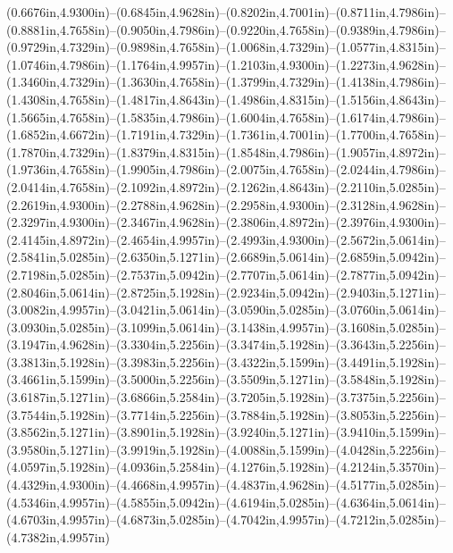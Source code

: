 (0.6676in,4.9300in)--(0.6845in,4.9628in)--(0.8202in,4.7001in)--(0.8711in,4.7986in)--(0.8881in,4.7658in)--(0.9050in,4.7986in)--(0.9220in,4.7658in)--(0.9389in,4.7986in)--(0.9729in,4.7329in)--(0.9898in,4.7658in)--(1.0068in,4.7329in)--(1.0577in,4.8315in)--(1.0746in,4.7986in)--(1.1764in,4.9957in)--(1.2103in,4.9300in)--(1.2273in,4.9628in)--(1.3460in,4.7329in)--(1.3630in,4.7658in)--(1.3799in,4.7329in)--(1.4138in,4.7986in)--(1.4308in,4.7658in)--(1.4817in,4.8643in)--(1.4986in,4.8315in)--(1.5156in,4.8643in)--(1.5665in,4.7658in)--(1.5835in,4.7986in)--(1.6004in,4.7658in)--(1.6174in,4.7986in)--(1.6852in,4.6672in)--(1.7191in,4.7329in)--(1.7361in,4.7001in)--(1.7700in,4.7658in)--(1.7870in,4.7329in)--(1.8379in,4.8315in)--(1.8548in,4.7986in)--(1.9057in,4.8972in)--(1.9736in,4.7658in)--(1.9905in,4.7986in)--(2.0075in,4.7658in)--(2.0244in,4.7986in)--(2.0414in,4.7658in)--(2.1092in,4.8972in)--(2.1262in,4.8643in)--(2.2110in,5.0285in)--(2.2619in,4.9300in)--(2.2788in,4.9628in)--(2.2958in,4.9300in)--(2.3128in,4.9628in)--(2.3297in,4.9300in)--(2.3467in,4.9628in)--(2.3806in,4.8972in)--(2.3976in,4.9300in)--(2.4145in,4.8972in)--(2.4654in,4.9957in)--(2.4993in,4.9300in)--(2.5672in,5.0614in)--(2.5841in,5.0285in)--(2.6350in,5.1271in)--(2.6689in,5.0614in)--(2.6859in,5.0942in)--(2.7198in,5.0285in)--(2.7537in,5.0942in)--(2.7707in,5.0614in)--(2.7877in,5.0942in)--(2.8046in,5.0614in)--(2.8725in,5.1928in)--(2.9234in,5.0942in)--(2.9403in,5.1271in)--(3.0082in,4.9957in)--(3.0421in,5.0614in)--(3.0590in,5.0285in)--(3.0760in,5.0614in)--(3.0930in,5.0285in)--(3.1099in,5.0614in)--(3.1438in,4.9957in)--(3.1608in,5.0285in)--(3.1947in,4.9628in)--(3.3304in,5.2256in)--(3.3474in,5.1928in)--(3.3643in,5.2256in)--(3.3813in,5.1928in)--(3.3983in,5.2256in)--(3.4322in,5.1599in)--(3.4491in,5.1928in)--(3.4661in,5.1599in)--(3.5000in,5.2256in)--(3.5509in,5.1271in)--(3.5848in,5.1928in)--(3.6187in,5.1271in)--(3.6866in,5.2584in)--(3.7205in,5.1928in)--(3.7375in,5.2256in)--(3.7544in,5.1928in)--(3.7714in,5.2256in)--(3.7884in,5.1928in)--(3.8053in,5.2256in)--(3.8562in,5.1271in)--(3.8901in,5.1928in)--(3.9240in,5.1271in)--(3.9410in,5.1599in)--(3.9580in,5.1271in)--(3.9919in,5.1928in)--(4.0088in,5.1599in)--(4.0428in,5.2256in)--(4.0597in,5.1928in)--(4.0936in,5.2584in)--(4.1276in,5.1928in)--(4.2124in,5.3570in)--(4.4329in,4.9300in)--(4.4668in,4.9957in)--(4.4837in,4.9628in)--(4.5177in,5.0285in)--(4.5346in,4.9957in)--(4.5855in,5.0942in)--(4.6194in,5.0285in)--(4.6364in,5.0614in)--(4.6703in,4.9957in)--(4.6873in,5.0285in)--(4.7042in,4.9957in)--(4.7212in,5.0285in)--(4.7382in,4.9957in) 